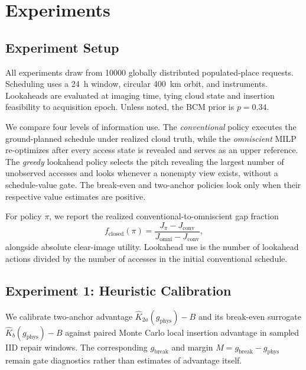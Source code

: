 \section{Experiments}
\label{sec:experiments}

\subsection{Experiment Setup}
\label{sec:experiment_setup}

All experiments draw from \num{10000} globally distributed populated-place requests. Scheduling uses a \SI{24}{\hour} window, circular \SI{400}{\kilo\metre} orbit, and  instruments. Lookaheads are evaluated at imaging time, tying cloud state and insertion feasibility to acquisition epoch. Unless noted, the BCM prior is $p=0.34$.

We compare four levels of information use. The \emph{conventional} policy executes the ground-planned schedule under realized cloud truth, while the \emph{omniscient} MILP re-optimizes after every access state is revealed and serves as an upper reference. The \emph{greedy} lookahead policy selects the pitch revealing the largest number of unobserved accesses and looks whenever a nonempty view exists, without a schedule-value gate. The break-even and two-anchor policies look only when their respective value estimates are positive.

For policy $\pi$, we report the realized conventional-to-omniscient gap fraction
\begin{equation}
f_{\mathrm{closed}}(\pi)
=
\frac{J_{\pi}-J_{\mathrm{conv}}}
{J_{\mathrm{omni}}-J_{\mathrm{conv}}},
\label{eq:gap_fraction_closed}
\end{equation}
alongside absolute clear-image utility. Lookahead use is the number of lookahead actions divided by the number of accesses in the initial conventional schedule.

\subsection{Experiment 1: Heuristic Calibration}
\label{sec:exp_heuristic_calibration}

We calibrate two-anchor advantage $\widehat{K}_{2a}(g_{\mathrm{phys}})-B$ and its break-even surrogate $\widehat{K}_{b}(g_{\mathrm{phys}})-B$ against paired Monte Carlo local insertion advantage in sampled IID repair windows. The corresponding $g_{\mathrm{break}}$ and margin $M=g_{\mathrm{break}}-g_{\mathrm{phys}}$ remain gate diagnostics rather than estimates of advantage itself.

